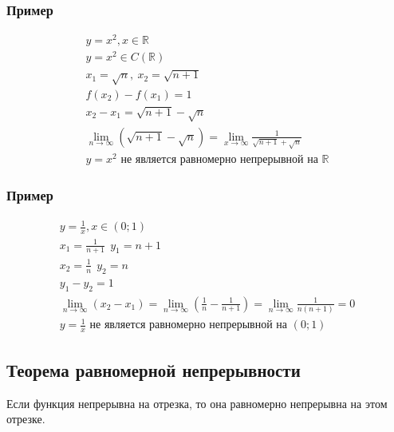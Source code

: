 \documentclass{article}
\begin{document}
\subsubsection{Пример}
\begin{gather*}
    y = x^2, x \in \mathbb{R} \\
    y = x^2 \in C(\mathbb{R}) \\
    x_1 = \sqrt{n}, ~ x_2 = \sqrt{n + 1} \\
    f(x_2) - f(x_1) = 1 \\
    x_2 - x_1 = \sqrt{n + 1} - \sqrt{n} \\
    \lim_{n \to \infty} (\sqrt{n + 1} - \sqrt{n}) = 
    \lim_{x \to \infty} \frac{1}{\sqrt{n + 1} + \sqrt{n}} \\
    y = x^2 \text{ не является равномерно непрерывной на } \mathbb{R}
\end{gather*}

\subsubsection{Пример}
\begin{gather*}
    y = \frac{1}{x}, x \in (0; 1) \\
    x_1 = \frac{1}{n + 1} ~~ y_1 = n + 1 \\
    x_2 = \frac{1}{n}     ~~ y_2 = n \\
    y_1 - y_2 = 1 \\
    \lim_{n \to \infty} (x_2 - x_1) = 
    \lim_{n \to \infty} (\frac{1}{n} - \frac{1}{n + 1}) =
    \lim_{n \to \infty} \frac{1}{n(n + 1)} = 0 \\
    y = \frac{1}{x} \text{ не является равномерно непрерывной на } (0; 1)
\end{gather*}



\subsection{Теорема равномерной непрерывности}
Если функция непрерывна на отрезка, то она равномерно непрерывна на этом отрезке.
\end{document}
